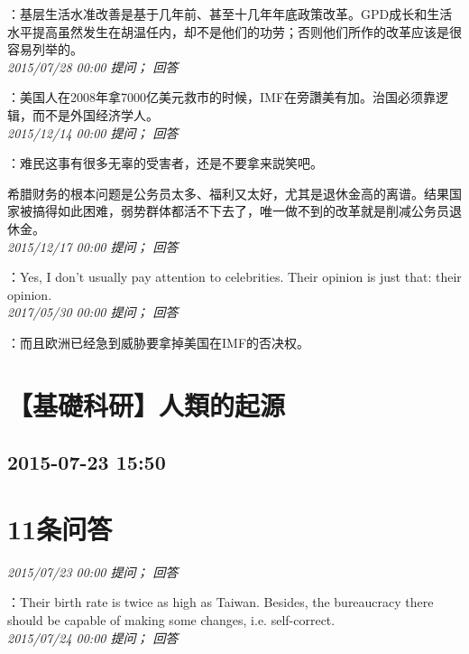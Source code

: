 \documentclass[twocolumn]{ctexart}
\begin{document}
：基层生活水准改善是基于几年前、甚至十几年年底政策改革。GPD成长和生活水平提高虽然发生在胡温任内，却不是他们的功劳；否则他们所作的改革应该是很容易列举的。\\

\textit{\hfill\noindent\small 2015/07/28 00:00 提问； 回答}

：美国人在2008年拿7000亿美元救市的时候，IMF在旁讚美有加。治国必须靠逻辑，而不是外国经济学人。\\

\textit{\hfill\noindent\small 2015/12/14 00:00 提问； 回答}

：难民这事有很多无辜的受害者，还是不要拿来説笑吧。

希腊财务的根本问题是公务员太多、福利又太好，尤其是退休金高的离谱。结果国家被搞得如此困难，弱势群体都活不下去了，唯一做不到的改革就是削减公务员退休金。\\

\textit{\hfill\noindent\small 2015/12/17 00:00 提问； 回答}

：Yes, I don't usually pay attention to celebrities. Their opinion is just that: their opinion.\\

\textit{\hfill\noindent\small 2017/05/30 00:00 提问； 回答}

：而且欧洲已经急到威胁要拿掉美国在IMF的否决权。\\


\section{【基礎科研】人類的起源}
\subsection{2015-07-23 15:50}


\section{11条问答}

\textit{\hfill\noindent\small 2015/07/23 00:00 提问； 回答}

：Their birth rate is twice as high as Taiwan. Besides, the bureaucracy there should be capable of making some changes, i.e. self-correct.\\

\textit{\hfill\noindent\small 2015/07/24 00:00 提问； 回答}
\end{document}
